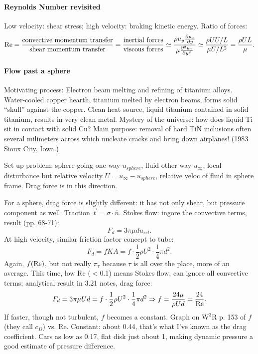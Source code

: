 \documentclass{report}
\begin{document}
\paragraph{Reynolds Number revisited}

Low velocity: shear stress; high velocity: braking kinetic energy.  Ratio of
forces:
$${\rm Re} = \frac{\rm convective\ momentum\ transfer}{\rm shear\ momentum
  \ transfer} = \frac{\rm inertial\ forces}{\rm viscous\ forces}\simeq
\frac{\rho u_y\frac{\partial u_x}{\partial y}}
{\mu\frac{\partial^2u_x}{\partial y^2}} \simeq
\frac{\rho U U/L}{\mu U/L^2} = \frac{\rho UL}{\mu}.$$

\paragraph{Flow past a sphere}

Motivating process: Electron beam melting and refining of titanium alloys.
Water-cooled copper hearth, titanium melted by electron beams, forms solid
``skull'' against the copper.  Clean heat source, liquid titanium contained in
solid titanium, results in very clean metal.  Mystery of the universe: how does
liquid Ti sit in contact with solid Cu?  Main purpose: removal of hard TiN
inclusions often several milimeters across which nucleate cracks and bring down
airplanes!  (1983 Sioux City, Iowa.)

Set up problem: sphere going one way $u_{sphere}$, fluid other way $u_\infty$,
local disturbance but relative velocity $U=u_\infty-u_{sphere}$, relative veloc
of fluid in sphere frame.  Drag force is in this direction.

For a sphere, drag force is slightly different: it has not only shear, but
pressure component as well.  Traction $\vec{t}=\sigma\cdot\hat{n}$.
Stokes flow: ingore the convective terms, result (pp. 68-71):
$$F_d = 3\pi\mu du_{rel}.$$
At high velocity, similar friction factor concept to tube:
$$F_d=fKA = f\cdot\frac{1}{2}\rho U^2\cdot\frac{1}{4}\pi d^2.$$
Again, $f({\rm Re})$, but not really $\pi_\tau$ because $\tau$ is all over the
place, more of an average.  This time, low Re ($<$0.1) means Stokes flow, can
ignore all convective terms; analytical result in 3.21 notes, drag force:
$$F_d = 3\pi\mu Ud = f\cdot\frac{1}{2}\rho U^2\cdot\frac{1}{4}\pi d^2
\Rightarrow f=\frac{24\mu}{\rho Ud} = \frac{24}{\rm Re}.$$
If faster, though not turbulent, $f$ becomes a constant.  Graph on W$^3$R
p. 153 of $f$ (they call $c_D$) vs. Re.  Constant: about 0.44, that's what I've
known as the drag coefficient.  Cars as low as 0.17, flat disk just about 1,
making dynamic pressure a good estimate of pressure difference.
\end{document}
